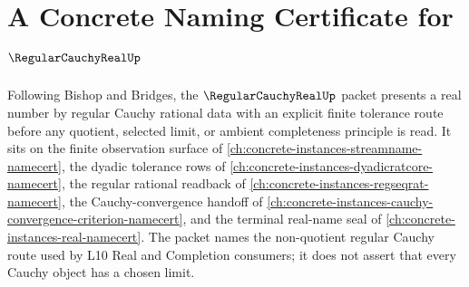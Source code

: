 \chapter{A Concrete Naming Certificate for $\RegularCauchyRealUp$}
\label{ch:concrete-instances-regular-cauchy-real-namecert}

Following Bishop and Bridges, the $\RegularCauchyRealUp$ packet presents a real number by regular Cauchy rational data with an explicit finite tolerance route before any quotient, selected limit, or ambient completeness principle is read. It sits on the finite observation surface of \autoref{ch:concrete-instances-streamname-namecert}, the dyadic tolerance rows of \autoref{ch:concrete-instances-dyadicratcore-namecert}, the regular rational readback of \autoref{ch:concrete-instances-regseqrat-namecert}, the Cauchy-convergence handoff of \autoref{ch:concrete-instances-cauchy-convergence-criterion-namecert}, and the terminal real-name seal of \autoref{ch:concrete-instances-real-namecert}. The packet names the non-quotient regular Cauchy route used by L10 Real and Completion consumers; it does not assert that every Cauchy object has a chosen limit.

